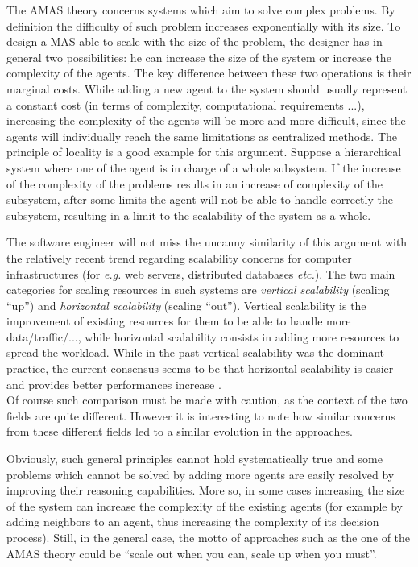 The AMAS theory concerns systems which aim to solve complex problems. By definition the difficulty of such problem increases exponentially with its size. To design a MAS able to scale with the size of the problem, the designer has in general two possibilities: he can increase the size of the system or increase the complexity of the agents. The key difference between these two operations is their marginal costs. While adding a new agent to the system should usually represent a constant cost (in terms of complexity, computational requirements ...), increasing the complexity of the agents will be more and more difficult, since the agents will individually reach the same limitations as centralized methods. The principle of locality is a good example for this argument. Suppose a hierarchical system where one of the agent is in charge of a whole subsystem. If the increase of the complexity of the problems results in an increase of complexity of the subsystem, after some limits the agent will not be able to handle correctly the subsystem, resulting in a limit to the scalability of the system as a whole.

The software engineer will not miss the uncanny similarity of this argument with the relatively recent trend regarding scalability concerns for computer infrastructures (for \emph{e.g.} web servers, distributed databases \emph{etc.}). The two main categories for scaling resources in such systems are \emph{vertical scalability} (scaling \enquote{up}) and \emph{horizontal scalability} (scaling \enquote{out}). Vertical scalability is the improvement of existing resources for them to be able to handle more data/traffic/..., while horizontal scalability consists in adding more resources to spread the workload. While in the past vertical scalability was the dominant practice, the current consensus seems to be that horizontal scalability is easier and provides better performances increase \cite{michael2007scale}.\\
Of course such comparison must be made with caution, as the context of the two fields are quite different. However it is interesting to note how similar concerns from these different fields led to a similar evolution in the approaches.

Obviously, such general principles cannot hold systematically true and some problems which cannot be solved by adding more agents are easily resolved by improving their reasoning capabilities. More so, in some cases increasing the size of the system can increase the complexity of the existing agents (for example by adding neighbors to an agent, thus increasing the complexity of its decision process). Still, in the general case, the motto of approaches such as the one of the AMAS theory could be \enquote{scale out when you can, scale up when you must}. 

